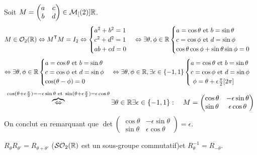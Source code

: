 \documentclass{book}
\begin{document}
\begin{Demonstration}
Soit $M=\begin{pmatrix}
a &c\\b&d\\
\end{pmatrix}\in\mathcal{M}_{[}(2)]{\mathbb{R}}$. 
$$M\in \mathcal{O}_2(\mathbb{R}) \Leftrightarrow M^{\mathsf {T}}M=I_2 \Leftrightarrow  \begin{cases}a^2+b^2=1\\ c^2+d^2=1\\ab+cd=0 \end{cases}\Leftrightarrow \exists \theta,\phi\in \mathbb{R} \begin{cases}a=\cos \theta \text{ et }b=\sin \theta\\ c=\cos \phi \text{ et }d=\sin \phi \\\cos \theta \cos \phi +\sin \theta \sin \phi=0 \end{cases}$$
$$
 \Leftrightarrow \exists \theta,\phi\in \mathbb{R} \begin{cases}a=\cos \theta \text{ et }b=\sin \theta\\ c=\cos \phi \text{ et }d=\sin \phi \\\cos (\theta - \phi)=0 \end{cases}
 \Leftrightarrow \exists \theta,\phi\in \mathbb{R},\exists\epsilon \in\{-1,1\} \begin{cases}a=\cos \theta \text{ et }b=\sin \theta\\ c=\cos \phi \text{ et }d=\sin \phi \\\ \phi=\theta+\epsilon\frac \pi 2[2\pi] \end{cases}$$
 $$
 \overbrace{\Leftrightarrow}^{\cos( \theta+\epsilon\frac \pi 2)=-\epsilon\sin \theta\text{ et }\sin( \theta+\epsilon\frac \pi 2)=\epsilon\cos \theta} \exists \theta\in \mathbb{R} \exists\epsilon \in\{-1,1\}: \quad M=\begin{pmatrix} \cos \theta &-\epsilon\sin \theta \\ \sin \theta & \epsilon \cos \theta \end{pmatrix}
 $$
 On conclut en remarquant que $\det \begin{pmatrix} \cos \theta &-\epsilon\sin \theta \\ \sin \theta & \epsilon \cos \theta \end{pmatrix}=\epsilon$.
\end{Demonstration}
\begin{Proposition}
$R_\theta R_{\theta'}=R_{\theta+\theta'}$ ($\mathcal{SO}_2(\mathbb{R})$ est un sous-groupe commutatif)et $R_\theta^{-1}= R_{-\theta}$.
\end{Proposition}
\end{document}
